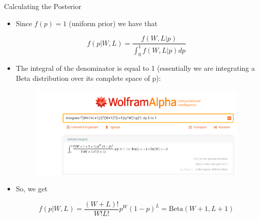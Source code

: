 \documentclass[handout]{beamer}
\begin{document}
\begin{frame}{Calculating the Posterior}
\scriptsize{

\begin{itemize}


\item Since $f(p)=1$ (uniform prior) we have that

\begin{displaymath}
f(p|W,L) = \frac{f(W,L|p)}{\int_0^1f(W,L|p)dp} 
\end{displaymath}

\item The integral of the denominator is equal to 1 (essentially we are integrating a Beta distribution over its complete space of p):

\begin{figure}[h!]
	\centering
	\includegraphics[scale=0.25]{pics/wolfram.png}
\end{figure}

\item So, we get 

\begin{displaymath}
f(p|W,L) =  \frac{(W+L)!}{W!L!}p^W(1-p)^L = \text{Beta}(W+1 , L+1) 
\end{displaymath}


\end{itemize}

} 

\end{frame}
\end{document}
